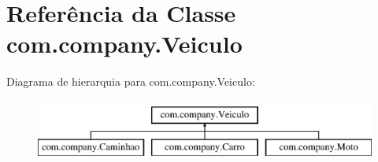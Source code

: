 \hypertarget{classcom_1_1company_1_1_veiculo}{}\section{Referência da Classe com.\+company.\+Veiculo}
\label{classcom_1_1company_1_1_veiculo}
Diagrama de hierarquia para com.\+company.\+Veiculo\+:\begin{figure}[H]
\begin{center}
\leavevmode
\includegraphics[height=2.000000cm]{classcom_1_1company_1_1_veiculo}
\end{center}
\end{figure}
